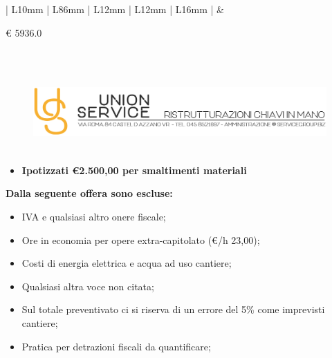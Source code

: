 \documentclass[a4paper]{article}
\begin{document}
                               \noindent\begin{tabular}{| L{10mm} |  L{86mm} | L{12mm} | L{12mm} | L{16mm} | }
                               \hline
                                &
                               \vspace{2.5mm}
                               \begin{spacing}{0}
                                 \euro\hfill
                            5936.0
                                           \end{spacing}\\
                                           \hline
                                        
                           \end{tabular}
                           \newpage
                                  \begin{figure}[!t]
                                  \includegraphics[width=15.8cm, height=3cm]{intestazioneAlta2.jpg}
                                  \end{figure}
                               
                          \begin{itemize}
                              \item \textbf{Ipotizzati \euro 2.500,00 per smaltimenti materiali}
                          \end{itemize}

                          \noindent\textbf{Dalla seguente offera sono escluse:}
                          \begin{itemize}
                              \item IVA e qualsiasi altro onere fiscale;
                              \item Ore in economia per opere extra-capitolato (\euro/h 23,00);
                              \item Costi di energia elettrica e acqua ad uso cantiere;
                              \item Qualsiasi altra voce non citata;
                              \item Sul totale preventivato ci si riserva di un errore del 5\% come imprevisti cantiere;
                              \item Pratica per detrazioni fiscali da quantificare;
                          \end{itemize}
\end{document}
